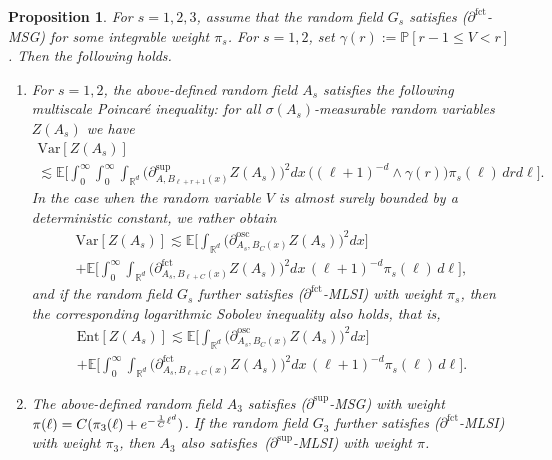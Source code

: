 \documentclass[11pt]{article}
\newtheorem{prop}[theo]{Proposition}
\theoremstyle{definition}
\numberwithin{equation}{section}
\numberwithin{figure}{section}
\numberwithin{table}{section}
\newcommand{\R}{\mathbb R}
\newcommand{\expecM}[1]{\mathbb{E}\bigg[#1 \bigg]}
\newcommand{\pr}[1]{\mathbb{P}\left[#1 \right]}
\newcommand{\parfct}[1]{\partial_{#1}^{\operatorname{fct}}}
\newcommand{\parsup}[1]{\partial_{#1}^{\operatorname{\sup}}}
\newcommand{\osc}{\partial^{\mathrm{osc}}}
\newcommand{\oscd}[1]{\mathrel{\osc_{#1}}}
\newcommand{\var}[1]{\mathrm{Var}\left[#1\right]}
\newcommand{\ent}[1]{\mathrm{Ent}\!\left[#1\right]}
\newcommand*{\romanenumi}{\renewcommand*{\theenumi}{\roman{enumi}}}
\begin{document}
\begin{prop}\label{prop:ex-dep-color}
For $s=1,2,3$, assume that the random field $G_s$ satisfies \emph{($\parfct{}$-MSG)} for some integrable weight $\pi_s$. For $s=1,2$, set $\gamma(r):=\pr{r-1\le V<r}$. Then the following holds.
\begin{enumerate}\romanenumi
\item \label{prop3.8.1}For $s=1,2$, the above-defined random field $A_s$ satisfies the following multiscale Poincaré inequality: for all $\sigma(A_s)$-measurable random variables $Z(A_s)$ we have
\begin{multline}\label{eq:s1-gen}
\var{Z(A_s)}\\
\lesssim
\expecM{\int_0^\infty\int_{0}^\infty\int_{\R^d}\Big(\parsup{A,B_{\ell+r+1}(x)}Z(A_s)\Big)^2dx\,\big((\ell+1)^{-d}\wedge\gamma(r)\big)\pi_s(\ell)\,drd\ell}.
\end{multline}
In the case when the random variable $V$ is almost surely bounded by a deterministic constant, we rather obtain
\begin{multline}\label{eq:s1-bound}
\var{Z(A_s)}\lesssim\expecM{\int_{\R^d}\Big(\oscd{A_s,B_{C}(x)}Z(A_s)\Big)^2dx}\\
+\expecM{\int_0^\infty\int_{\R^d}\Big(\parfct{A_s,B_{\ell+C}(x)}Z(A_s)\Big)^2dx\,(\ell+1)^{-d}\pi_s(\ell)\,d\ell},
\end{multline}
and if the random field $G_s$ further satisfies \emph{($\parfct{}$-MLSI)} with weight $\pi_s$, then the corresponding logarithmic Sobolev inequality also holds, that is,
\begin{multline*}
\ent{Z(A_s)}\lesssim\expecM{\int_{\R^d}\Big(\oscd{A_s,B_{C}(x)}Z(A_s)\Big)^2dx}\\
+\expecM{\int_0^\infty\int_{\R^d}\Big(\parfct{A_s,B_{\ell+C}(x)}Z(A_s)\Big)^2dx\,(\ell+1)^{-d}\pi_s(\ell)\,d\ell}.
\end{multline*}
\item \label{prop3.8.2}The above-defined random field $A_3$ satisfies \emph{($\parsup{}$-MSG)} with weight $\pi(\ell)\linebreak=C(\pi_3(\ell)+e^{-\frac1C\ell^d})$. If the random field $G_3$ further satisfies \emph{($\parfct{}$-MLSI)} with weight $\pi_3$, then $A_3$ also satisfies~\emph{($\parsup{}$-MLSI)} with weight $\pi$.
\qedhere
\end{enumerate}
\end{prop}
\end{document}
